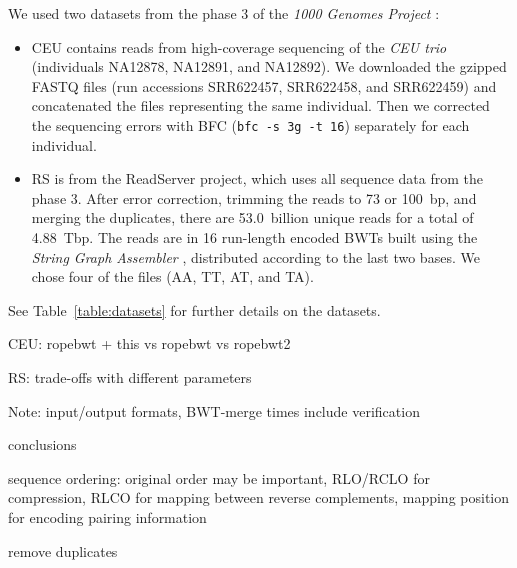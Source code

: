 \documentclass[smallabstract,smallcaptions]{dccpaper}
\newcommand{\BWT}{\textsf{BWT}}
\newcommand{\CEU}{\textsf{CEU}}
\newcommand{\RS}{\textsf{RS}}
\begin{document}
We used two datasets from the phase 3 of the \emph{1000 Genomes Project} \cite{1000GP2015}:
\begin{itemize}

\item \CEU{} contains reads from high-coverage sequencing of the \emph{CEU trio} (individuals NA12878, NA12891, and NA12892). We downloaded the gzipped FASTQ files (run accessions SRR622457, SRR622458, and SRR622459) and concatenated the files representing the same individual. Then we corrected the sequencing errors with BFC \cite{Li2015} (\texttt{bfc -s 3g -t 16}) separately for each individual.

\item \RS{} is from the ReadServer project, which uses all sequence data from the phase 3. After error correction, trimming the reads to 73 or 100~bp, and merging the duplicates, there are 53.0~billion unique reads for a total of 4.88~Tbp. The reads are in 16 run-length encoded \BWT{}s built using the \emph{String Graph Assembler} \cite{Simpson2012}, distributed according to the last two bases. We chose four of the files (AA, TT, AT, and TA).

\end{itemize}
See Table~\ref{table:datasets} for further details on the datasets.

CEU: ropebwt + this vs ropebwt vs ropebwt2

RS: trade-offs with different parameters

Note: input/output formats, BWT-merge times include verification



conclusions

sequence ordering: original order may be important, RLO/RCLO for compression, RLCO for mapping between reverse complements, mapping position for encoding pairing information

remove duplicates




\end{document}
